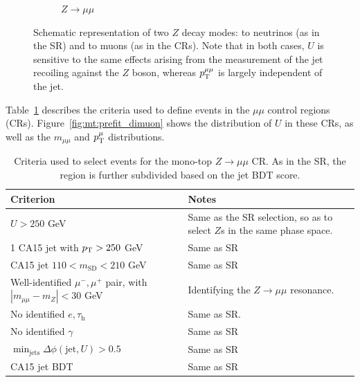 \begin{figure}[]
\begin{center}
\begin{subfigure}[t]{0.49\textwidth}
            \caption{$Z\rightarrow\mu\mu$}
        \end{subfigure}
        \caption{Schematic representation of two $Z$ decay modes: to neutrinos (as in the SR) and to muons (as in the CRs).
                 Note that in both cases, $U$ is sensitive to the same effects arising from the measurement of the jet recoiling against the $Z$ boson, whereas $p_\mathrm{T}^{\mu\mu}$ is largely independent of the jet.}
        \label{fig:mt:zvsz}
    \end{center}
\end{figure}

Table~\ref{tab:mt:zmm_cuts} describes the criteria used to define events in the \emph{$\mu\mu$} control regions (CRs).
Figure~\ref{fig:mt:prefit_dimuon} shows the distribution of $U$ in these CRs, as well as the $m_{\mu\mu}$ and $p_\mathrm{T}^\mu$ distributions.

\begin{table}[]
    \caption{Criteria used to select events for the mono-top $Z\rightarrow\mu\mu$ CR. As in the SR, the region is further subdivided based on the jet BDT score.}
    \label{tab:mt:zmm_cuts}
    \centering
    \begin{tabular}{p{}p{}}
        Criterion & Notes \\
        \hline
        \hline
        $U>250$ GeV & Same as the SR selection, so as to select $Z$s in the same phase space. \\
        1 CA15 jet with $p_\mathrm{T}>250$ GeV &  Same as SR \\
        CA15 jet $110 < m_\mathrm{SD} < 210$ GeV & Same as SR \\
        \hline
        Well-identified $\mu^-,\mu^+$ pair, with $|m_{\mu\mu}-m_Z|<30$ GeV & Identifying the $Z\rightarrow\mu\mu$ resonance. \\
        No identified $e,\tau_\mathrm{h}$ & Same as SR. \\
        No identified $\gamma$ & Same as SR \\
        \hline
        $\min_\mathrm{jets}\Delta\phi(\mathrm{jet},U) > 0.5$ & Same as SR \\
        \hline
        CA15 jet BDT & Same as SR\\
    \end{tabular}
\end{table}

